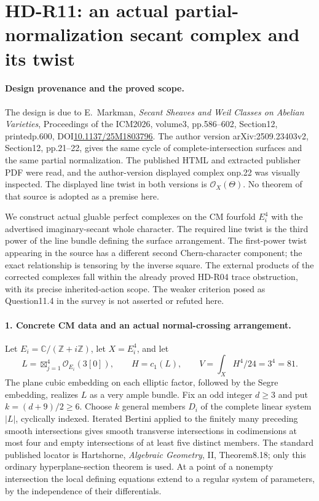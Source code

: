 \section{HD-R11: an actual partial-normalization secant complex and its twist}
\label{sec:partial-normalization-secant-correction}

\paragraph{Design provenance and the proved scope.}
The design is due to E.~Markman, \emph{Secant Sheaves and Weil
Classes on Abelian Varieties}, Proceedings of the ICM2026,
volume3, pp.586--602, Section12, printedp.600,
DOI\href{https://doi.org/10.1137/25M1803796}{10.1137/25M1803796}.
The author version arXiv:2509.23403v2, Section12, pp.21--22,
gives the same cycle of complete-intersection surfaces and the
same partial normalization. The published HTML and extracted
publisher PDF were read, and the author-version displayed
complex onp.22 was visually inspected. The displayed line twist
in both versions is $\mathcal O_X(\Theta)$.
No theorem of that source is adopted as a premise here.

We construct actual gluable perfect complexes on the CM fourfold
$E_i^4$ with the advertised imaginary-secant whole character.
The required line twist is the third power of the line bundle
defining the surface arrangement. The first-power twist appearing
in the source has a different second Chern-character component;
the exact relationship is tensoring by the inverse square.
The external products of the corrected complexes fall within
the already proved HD-R04 trace obstruction, with its precise
inherited-action scope. The weaker criterion posed as
Question11.4 in the survey is not asserted or refuted here.

\paragraph{1. Concrete CM data and an actual normal-crossing arrangement.}
Let $E_i=\mathbb C/(\mathbb Z+i\mathbb Z)$, let $X=E_i^4$,
and let
\[
 L=\mathop{\boxtimes}_{j=1}^4\mathcal O_{E_i}(3[0]),
 \qquad H=c_1(L),\qquad V=\int_XH^4/24=3^4=81.
                                                               \tag{R11.1}
\]
The plane cubic embedding on each elliptic factor, followed by
the Segre embedding, realizes $L$ as a very ample bundle.
Fix an odd integer $d\ge3$ and put $k=(d+9)/2\ge6$.
Choose $k$ general members $D_i$ of the complete linear system
$|L|$, cyclically indexed. Iterated Bertini applied to the
finitely many preceding smooth intersections gives smooth
transverse intersections in codimensions at most four and empty
intersections of at least five distinct members. The standard
published locator is Hartshorne, \emph{Algebraic Geometry},
II, Theorem8.18; only this ordinary hyperplane-section theorem
is used. At a point of a nonempty intersection the local defining
equations extend to a regular system of parameters, by the
independence of their differentials.

